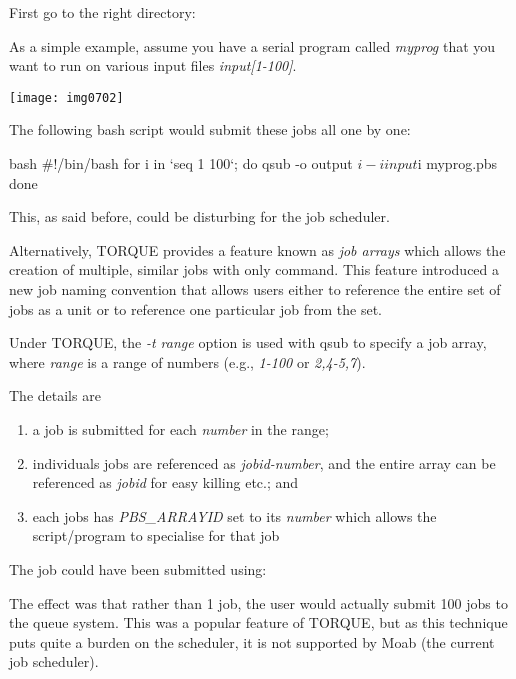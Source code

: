 First go to the right directory:

\begin{prompt}
\end{prompt}

As a simple example, assume you have a serial program called \emph{myprog} that you
want to run on various input files \textit{input[1-100]}.

\begin{center}
\texttt{[image: img0702]}
\end{center}

The following bash script would submit these jobs all one by one:
\begin{code}{bash}
#!/bin/bash
for i in `seq 1 100`; do
   qsub -o output $i -i input $i myprog.pbs
done
\end{code}

This, as said before, could be disturbing for the job scheduler.

Alternatively, TORQUE provides a feature known as \emph{job arrays} which
allows the creation of multiple, similar jobs with only 
command. This feature introduced a new job naming convention that allows users
either to reference the entire set of jobs as a unit or to reference one
particular job from the set.

Under TORQUE, the \emph{-t range} option is used with qsub to specify a job
array, where \emph{range} is a range of numbers (e.g., \emph{1-100} or
\emph{2,4-5,7}).

The details are

\begin{enumerate}
\item  a job is submitted for each \emph{number} in the range;
\item  individuals jobs are referenced as \emph{jobid-number}, and the entire array can be referenced as \emph{jobid} for easy killing etc.; and
\item  each jobs has \emph{PBS\_ARRAYID} set to its \emph{number} which allows the script/program to specialise for that job
\end{enumerate}

The job could have been submitted using:

\begin{prompt}
\end{prompt}

The effect was that rather than 1 job, the user would actually submit 100 jobs
to the queue system. This was a popular feature of TORQUE, but as this
technique puts quite a burden on the scheduler, it is not supported by Moab
(the current job scheduler).

